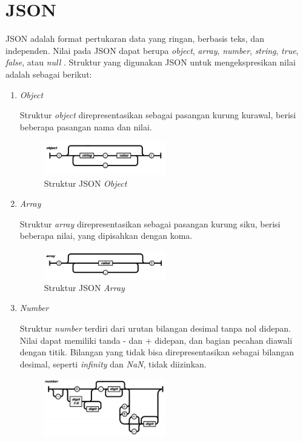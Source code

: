 \section{JSON}
\par JSON adalah format pertukaran data yang ringan, berbasis teks, dan independen. Nilai pada JSON dapat berupa \textit{object}, \textit{array}, \textit{number}, \textit{string}, \textit{true}, \textit{false}, atau \textit{null} \cite{json-online}. Struktur yang digunakan JSON untuk mengekspresikan nilai adalah sebagai berikut:
\begin{enumerate}[listparindent=2.5em]
	\item \textit{Object}
	\par Struktur \textit{object} direpresentasikan sebagai pasangan kurung kurawal, berisi beberapa pasangan nama dan nilai.
	\begin{figure}[H]
		\centering\includegraphics[width=0.5\textwidth]{bab2/img/json_object.jpg}
		\caption{Struktur JSON \textit{Object}}
	\end{figure}
	\item \textit{Array}
	\par Struktur \textit{array} direpresentasikan sebagai pasangan kurung siku, berisi beberapa nilai, yang dipisahkan dengan koma.
	\begin{figure}[H]
		\centering\includegraphics[width=0.5\textwidth]{bab2/img/json_array.jpg}
		\caption{Struktur JSON \textit{Array}}
	\end{figure}
	\item \textit{Number}
	\par Struktur \textit{number} terdiri dari urutan bilangan desimal tanpa nol didepan. Nilai dapat memiliki tanda - dan + didepan, dan bagian pecahan diawali dengan titik. Bilangan yang tidak bisa direpresentasikan sebagai bilangan desimal, seperti \textit{infinity} dan \textit{NaN}, tidak diizinkan.
	\begin{figure}[H]
		\centering\includegraphics[width=0.5\textwidth]{bab2/img/json_number.jpg}

\end{figure}
\end{enumerate}
